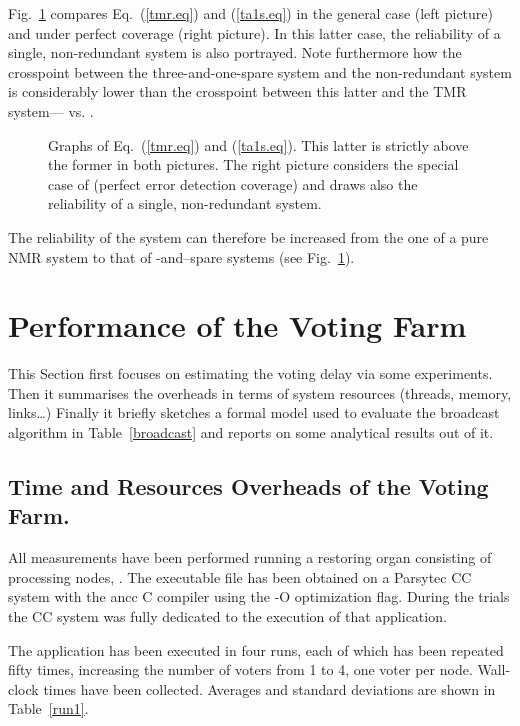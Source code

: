 \documentclass[11pt]{article}
\begin{document}
Fig.~\ref{rel} compares Eq.~(\ref{tmr.eq}) and (\ref{ta1s.eq}) in the general case
(left picture) and under perfect coverage (right picture). In this latter case,
the reliability of a single, non-redundant system is also portrayed. Note furthermore how
the crosspoint between the three-and-one-spare system and the non-redundant system
is considerably lower than the crosspoint between this latter and the TMR system---
vs. .
\begin{figure}
\hskip-1cm
\caption{Graphs of Eq.~(\ref{tmr.eq}) and (\ref{ta1s.eq}). This latter is strictly above
the former in both pictures. The right picture considers the special case of  (perfect
error detection coverage) and draws also
the reliability of a single, non-redundant system.}
\label{rel}
\end{figure}
The reliability of the system can therefore be increased
from the one of a pure NMR system to that of -and--spare
systems (see Fig.~\ref{rel}).



\section{Performance of the Voting Farm}\label{perf}
This Section first focuses on estimating the voting delay via some experiments. Then it
summarises the overheads in terms of system resources (threads, memory, links\ldots)
Finally it briefly sketches a formal model used to evaluate the broadcast algorithm
in Table~\ref{broadcast} and reports on some analytical results out of it.

\subsection{Time and Resources Overheads of the Voting Farm.}
All measurements have been performed running a restoring organ consisting
of  processing nodes, .
The executable file has been obtained on a Parsytec CC system
with the {\sf ancc} C compiler using the
{\sf -O} optimization flag. During the trials the CC system was fully dedicated to the execution
of that application. 

The application has been executed in four runs, each of which
has been repeated fifty times, increasing the number of voters from
1 to 4, one voter per node.  Wall-clock times have been collected.
Averages and standard deviations are shown in Table~\ref{run1}.
\end{document}
